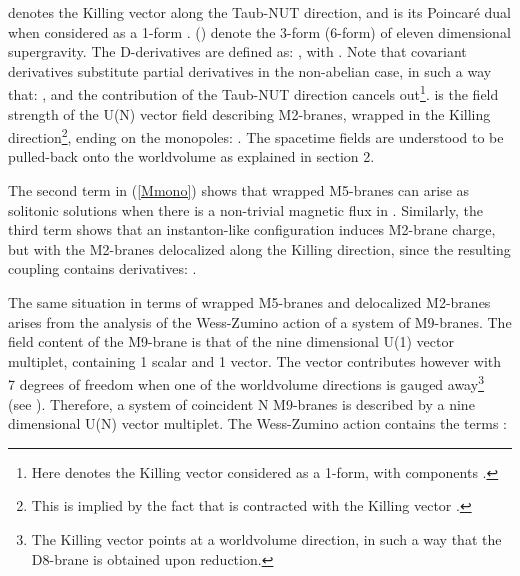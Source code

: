 \documentclass[12pt,a4paper]{article}
\begin{document}
\noindent {}\coordHE{} denotes the Killing vector along the
Taub-NUT direction, and
\coordHE{} is its Poincar\'e dual when
considered as a 1-form \coordHE{}.
\coordHE{} (\coordHE{}) denote the 3-form
(6-form) of eleven dimensional supergravity.  
The D-derivatives are defined as:
\coordHE{}, with
\coordHE{}. Note that covariant
derivatives substitute partial derivatives in the non-abelian case,
in such a way that:  
\coordHE{}, 
and the contribution of the 
Taub-NUT direction cancels out\footnote{Here \coordHE{} denotes
the Killing vector considered as a 1-form, with components
\coordHE{}.}. 
\coordHE{} is the
field strength of the U(N) vector field describing 
M2-branes, wrapped in the Killing direction\footnote{This is implied
by the fact that \coordHE{} is contracted with the Killing vector
\cite{BEL}.}, ending on the monopoles:
\coordHE{}. The spacetime fields
are understood to be pulled-back onto the worldvolume as explained
in section 2.

The second term in (\ref{Mmono}) shows that wrapped M5-branes can
arise as solitonic solutions when there is a non-trivial magnetic
flux in \coordHE{}. Similarly, the third term shows that an instanton-like
configuration \coordHE{} induces
M2-brane charge, but with the M2-branes delocalized along
the Killing direction, since the resulting
coupling contains \coordHE{} derivatives:
\coordHE{}.
 
The same situation in terms of wrapped M5-branes and delocalized
M2-branes arises from the analysis of the Wess-Zumino action of
a system of M9-branes. The field content of the M9-brane is that
of the nine dimensional U(1) vector multiplet, containing 1 scalar
and 1 vector. The vector contributes however with 7 degrees of
freedom when one of the worldvolume directions is gauged 
away\footnote{The Killing vector points at a worldvolume direction,
in such a way that the D8-brane is obtained upon reduction.}
(see \cite{BvdS}). Therefore, a system of coincident N M9-branes
is described by a nine dimensional U(N) vector multiplet.
The Wess-Zumino action contains the terms \cite{Sato}:
\end{document}
